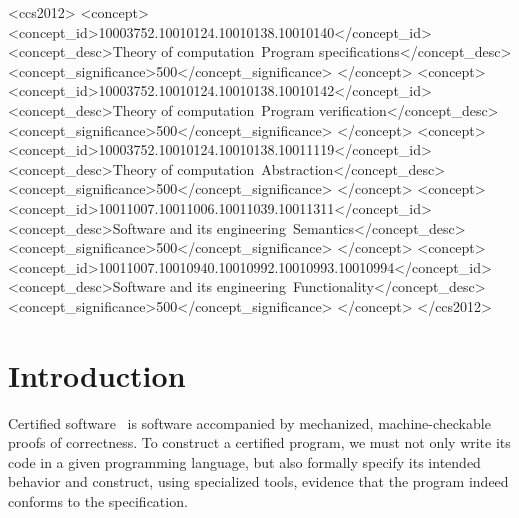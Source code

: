 \documentclass[sigplan,screen]{acmart}
\begin{document}
\begin{CCSXML}
<ccs2012>
<concept>
<concept_id>10003752.10010124.10010138.10010140</concept_id>
<concept_desc>Theory of computation~Program specifications</concept_desc>
<concept_significance>500</concept_significance>
</concept>
<concept>
<concept_id>10003752.10010124.10010138.10010142</concept_id>
<concept_desc>Theory of computation~Program verification</concept_desc>
<concept_significance>500</concept_significance>
</concept>
<concept>
<concept_id>10003752.10010124.10010138.10011119</concept_id>
<concept_desc>Theory of computation~Abstraction</concept_desc>
<concept_significance>500</concept_significance>
</concept>
<concept>
<concept_id>10011007.10011006.10011039.10011311</concept_id>
<concept_desc>Software and its engineering~Semantics</concept_desc>
<concept_significance>500</concept_significance>
</concept>
<concept>
<concept_id>10011007.10010940.10010992.10010993.10010994</concept_id>
<concept_desc>Software and its engineering~Functionality</concept_desc>
<concept_significance>500</concept_significance>
</concept>
</ccs2012>
\end{CCSXML}



\maketitle
\thispagestyle{empty}
\section{Introduction} \label{sec:intro} %


Certified software~\cite{shao10}
is software accompanied by
mechanized, machine-checkable proofs of correctness.
To construct a certified program,
we must not only write its code in a given programming language,
but also formally specify its intended behavior
and construct, using specialized tools,
evidence that the program
indeed conforms to the specification.
\end{document}
